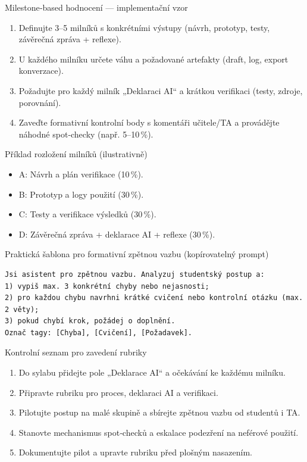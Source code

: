 \documentclass{report}%
\begin{document}
Milestone‑based hodnocení — implementační vzor
\begin{enumerate}
  \item Definujte 3–5 milníků s konkrétními výstupy (návrh, prototyp, testy, závěrečná zpráva + reflexe).
  \item U každého milníku určete váhu a požadované artefakty (draft, log, export konverzace).
  \item Požadujte pro každý milník „Deklaraci AI“ a krátkou verifikaci (testy, zdroje, porovnání).
  \item Zaveďte formativní kontrolní body s komentáři učitele/TA a provádějte náhodné spot‑checky (např. 5–10\,\%).
\end{enumerate}

Příklad rozložení milníků (ilustrativně)
\begin{itemize}
  \item A: Návrh a plán verifikace (10\,\%).
  \item B: Prototyp a logy použití (30\,\%).
  \item C: Testy a verifikace výsledků (30\,\%).
  \item D: Závěrečná zpráva + deklarace AI + reflexe (30\,\%).
\end{itemize}

Praktická šablona pro formativní zpětnou vazbu (kopírovatelný prompt)
\begin{verbatim}
Jsi asistent pro zpětnou vazbu. Analyzuj studentský postup a:
1) vypiš max. 3 konkrétní chyby nebo nejasnosti;
2) pro každou chybu navrhni krátké cvičení nebo kontrolní otázku (max. 2 věty);
3) pokud chybí krok, požádej o doplnění.
Označ tagy: [Chyba], [Cvičení], [Požadavek].
\end{verbatim}

Kontrolní seznam pro zavedení rubriky
\begin{enumerate}
  \item Do sylabu přidejte pole „Deklarace AI“ a očekávání ke každému milníku.
  \item Připravte rubriku pro proces, deklaraci AI a verifikaci.
  \item Pilotujte postup na malé skupině a sbírejte zpětnou vazbu od studentů i TA.
  \item Stanovte mechanismus spot‑checků a eskalace podezření na neférové použití.
  \item Dokumentujte pilot a upravte rubriku před plošným nasazením.
\end{enumerate}
\end{document}
